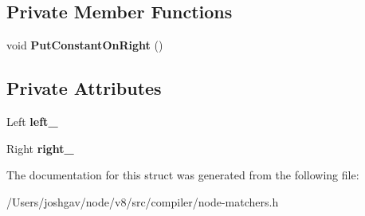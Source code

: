 \subsection*{Private Member Functions}
\begin{DoxyCompactItemize}
\item 
void {\bfseries Put\+Constant\+On\+Right} ()\hypertarget{structv8_1_1internal_1_1compiler_1_1_binop_matcher_a1c60916679d6ecfc9fba7b01484161d9}{}\label{structv8_1_1internal_1_1compiler_1_1_binop_matcher_a1c60916679d6ecfc9fba7b01484161d9}

\end{DoxyCompactItemize}
\subsection*{Private Attributes}
\begin{DoxyCompactItemize}
\item 
Left {\bfseries left\+\_\+}\hypertarget{structv8_1_1internal_1_1compiler_1_1_binop_matcher_ad3442c02bff0644b9cd15d0cfc656272}{}\label{structv8_1_1internal_1_1compiler_1_1_binop_matcher_ad3442c02bff0644b9cd15d0cfc656272}

\item 
Right {\bfseries right\+\_\+}\hypertarget{structv8_1_1internal_1_1compiler_1_1_binop_matcher_ab68fd12635c76bef05026be4c25658c8}{}\label{structv8_1_1internal_1_1compiler_1_1_binop_matcher_ab68fd12635c76bef05026be4c25658c8}

\end{DoxyCompactItemize}


The documentation for this struct was generated from the following file\+:\begin{DoxyCompactItemize}
\item 
/\+Users/joshgav/node/v8/src/compiler/node-\/matchers.\+h\end{DoxyCompactItemize}

